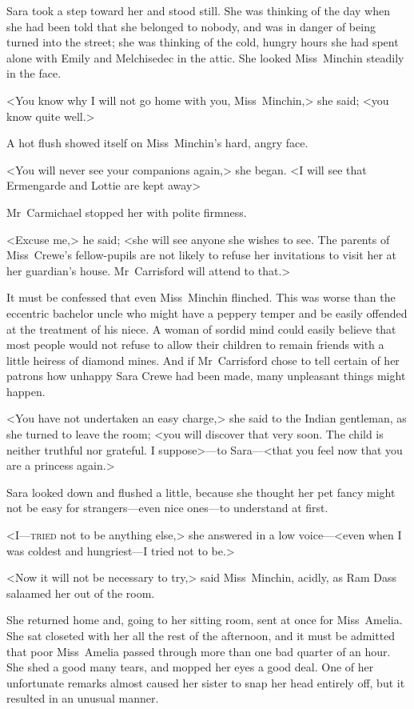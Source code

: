 Sara took a step toward her and stood still. She was thinking of the day when she had been told that she belonged to nobody, and was in danger of being turned into the street; she was thinking of the cold, hungry hours she had spent alone with Emily and Melchisedec in the attic. She looked Miss~Minchin steadily in the face.

<You know why I will not go home with you, Miss~Minchin,> she said; <you know quite well.>

A hot flush showed itself on Miss~Minchin's hard, angry face.

<You will never see your companions again,> she began. <I will see that Ermengarde and Lottie are kept away\longdash>

Mr~Carmichael stopped her with polite firmness.

<Excuse me,> he said; <she will see anyone she wishes to see. The parents of Miss~Crewe's fellow-pupils are not likely to refuse her invitations to visit her at her guardian's house. Mr~Carrisford will attend to that.>

It must be confessed that even Miss~Minchin flinched. This was worse than the eccentric bachelor uncle who might have a peppery temper and be easily offended at the treatment of his niece. A woman of sordid mind could easily believe that most people would not refuse to allow their children to remain friends with a little heiress of diamond mines. And if Mr~Carrisford chose to tell certain of her patrons how unhappy Sara Crewe had been made, many unpleasant things might happen.

<You have not undertaken an easy charge,> she said to the Indian gentleman, as she turned to leave the room; <you will discover that very soon. The child is neither truthful nor grateful. I suppose>—to Sara—<that you feel now that you are a princess again.>

Sara looked down and flushed a little, because she thought her pet fancy might not be easy for strangers—even nice ones—to understand at first.

<I—\textsc{tried} not to be anything else,> she answered in a low voice—<even when I was coldest and hungriest—I tried not to be.>

<Now it will not be necessary to try,> said Miss~Minchin, acidly, as Ram Dass salaamed her out of the room.


She returned home and, going to her sitting room, sent at once for Miss~Amelia. She sat closeted with her all the rest of the afternoon, and it must be admitted that poor Miss~Amelia passed through more than one bad quarter of an hour. She shed a good many tears, and mopped her eyes a good deal. One of her unfortunate remarks almost caused her sister to snap her head entirely off, but it resulted in an unusual manner.

